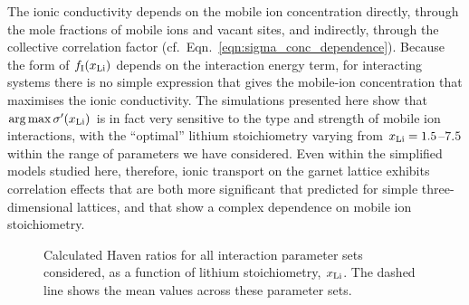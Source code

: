 \documentclass[aps,prb,twocolumn,superscriptaddress,reprint]{revtex4-1}
\newcommand{\xLi}{x_\m{Li}}
\begin{document}
The ionic conductivity depends on the mobile ion concentration directly, through the mole fractions of mobile ions and vacant sites, and indirectly, through the collective correlation factor (cf.\ Eqn.~\ref{eqn:sigma_conc_dependence}). Because the form of $f_\m{I}(\xLi)$ depends on the interaction energy term, for interacting systems there is no simple expression that gives the mobile-ion concentration that maximises the ionic conductivity. The simulations presented here show that $\arg \max \sigma^\prime(\xLi)$ is in fact very sensitive to the type and strength of mobile ion interactions, with the ``optimal'' lithium stoichiometry varying from $\xLi=1.5$--$7.5$ within the range of parameters we have considered. Even within the simplified models studied here, therefore, ionic transport on the garnet lattice exhibits correlation effects that are both more significant that predicted for simple three-dimensional lattices, and that show a complex dependence on mobile ion stoichiometry.

\begin{figure}[tb]
  \centering
    \caption{\label{fig:haven_ratios}Calculated Haven ratios for all interaction parameter sets considered, as a function of lithium stoichiometry, $\xLi$. The dashed line shows the mean values across these parameter sets.}
\end{figure}
\end{document}
